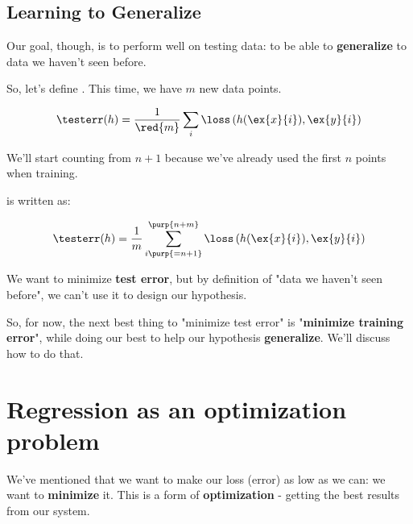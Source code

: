     \subsection{Learning to Generalize}
        
        Our goal, though, is to perform well on testing data: to be able to \textbf{generalize} to data we haven't seen before.
        
        So, let's define . This time, we have $m$ new data points.
        
        \begin{equation}
            \testerr(h) = \frac{1}{\red{m}}  \sum_i  \loss \left( h(\ex{x}{i}), \ex{y}{i} \right) 
        \end{equation}
        
        We'll start counting from $n+1$ because we've already used the first $n$ points when training.\\
        
        \begin{kequation}
        
             is written as:
            
            \begin{equation}
                \testerr(h) =
                \frac{1}{m}  \sum_{i\purp{=n+1}}^{\purp{n+m}} \loss \left( h(\ex{x}{i}), \ex{y}{i} \right) 
            \end{equation}
        \end{kequation}
        
        
        We want to minimize \textbf{test error}, but by definition of "data we haven't seen before", we can't use it to design our hypothesis.
        
        So, for now, the next best thing to "minimize test error" is "\textbf{minimize training error}", while doing our best to help our hypothesis \textbf{generalize}. We'll discuss how to do that.

\pagebreak

\section{Regression as an optimization problem}
    
    We've mentioned that we want to make our loss (error) as low as we can: we want to \textbf{minimize} it. This is a form of \textbf{optimization} - getting the best results from our system.
    
